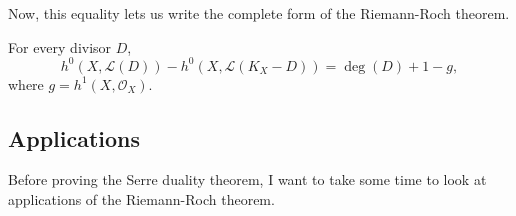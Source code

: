 Now, this equality lets us write the complete form of the Riemann-Roch
theorem.
\begin{thm}\label{thm:riemann_roch}
  For every divisor $D$,
  \[
    h^{0}(X, \mathcal{L}(D))-h^{0}(X, \mathcal{L}(K_{X}-D))=\deg(D)+1-g,
  \]
  where $g=h^{1}(X, \mathcal{O}_{X})$.
\end{thm}

\subsection{Applications}
Before proving the Serre duality theorem, I want to take some time to
look at applications of the Riemann-Roch theorem.
